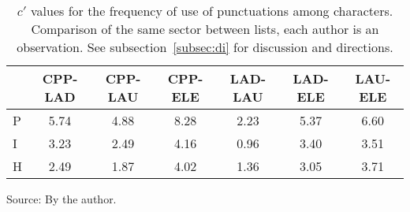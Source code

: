 \begin{table}
  \centering
  \caption{$c'$ values for the frequency of use of punctuations among characters. Comparison of the same sector between lists, each author is an observation. See subsection~\ref{subsec:di} for discussion and directions.}
    \small
\setlength{\tabcolsep}{.06667em}
  \begin{tabular}{l|| c|c|c|c|c|c}\hline
 & CPP-LAD & CPP-LAU & CPP-ELE & LAD-LAU & LAD-ELE & LAU-ELE \\\hline\hline
P & 5.74 & 4.88 & 8.28 & 2.23 & 5.37 & 6.60 \\\hline
I & 3.23 & 2.49 & 4.16 & 0.96 & 3.40 & 3.51 \\\hline
H & 2.49 & 1.87 & 4.02 & 1.36 & 3.05 & 3.71 \\\hline
  \end{tabular}
\begin{flushleft}\footnotesize
		Source: By the author.\
\end{flushleft}
  \label{tab:kolPctInter}
\end{table}
 
